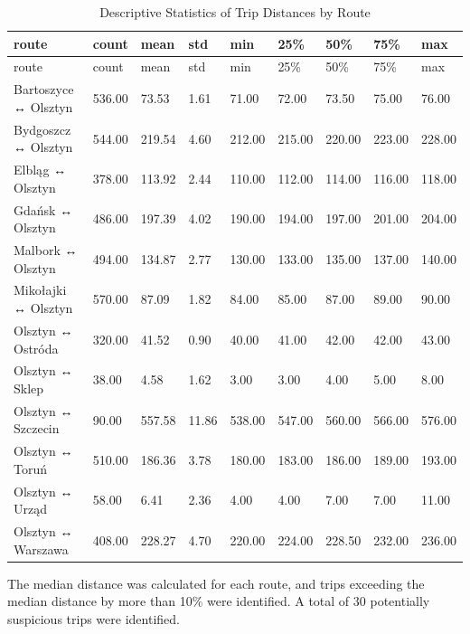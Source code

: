 \documentclass[
  letterpaper,
  DIV=11,
  numbers=noendperiod]{scrartcl}
\begin{document}
\begin{longtable}[]{@{}lllllllll@{}}
\caption{Descriptive Statistics of Trip Distances by
Route}\label{T_25378}\tabularnewline
\toprule\noalign{}
route & count & mean & std & min & 25\% & 50\% & 75\% & max \\
\midrule\noalign{}
\endfirsthead
\toprule\noalign{}
route & count & mean & std & min & 25\% & 50\% & 75\% & max \\
\midrule\noalign{}
\endhead
\bottomrule\noalign{}
\endlastfoot
Bartoszyce ↔ Olsztyn & 536.00 & 73.53 & 1.61 & 71.00 & 72.00 & 73.50 &
75.00 & 76.00 \\
Bydgoszcz ↔ Olsztyn & 544.00 & 219.54 & 4.60 & 212.00 & 215.00 & 220.00
& 223.00 & 228.00 \\
Elbląg ↔ Olsztyn & 378.00 & 113.92 & 2.44 & 110.00 & 112.00 & 114.00 &
116.00 & 118.00 \\
Gdańsk ↔ Olsztyn & 486.00 & 197.39 & 4.02 & 190.00 & 194.00 & 197.00 &
201.00 & 204.00 \\
Malbork ↔ Olsztyn & 494.00 & 134.87 & 2.77 & 130.00 & 133.00 & 135.00 &
137.00 & 140.00 \\
Mikołajki ↔ Olsztyn & 570.00 & 87.09 & 1.82 & 84.00 & 85.00 & 87.00 &
89.00 & 90.00 \\
Olsztyn ↔ Ostróda & 320.00 & 41.52 & 0.90 & 40.00 & 41.00 & 42.00 &
42.00 & 43.00 \\
Olsztyn ↔ Sklep & 38.00 & 4.58 & 1.62 & 3.00 & 3.00 & 4.00 & 5.00 &
8.00 \\
Olsztyn ↔ Szczecin & 90.00 & 557.58 & 11.86 & 538.00 & 547.00 & 560.00 &
566.00 & 576.00 \\
Olsztyn ↔ Toruń & 510.00 & 186.36 & 3.78 & 180.00 & 183.00 & 186.00 &
189.00 & 193.00 \\
Olsztyn ↔ Urząd & 58.00 & 6.41 & 2.36 & 4.00 & 4.00 & 7.00 & 7.00 &
11.00 \\
Olsztyn ↔ Warszawa & 408.00 & 228.27 & 4.70 & 220.00 & 224.00 & 228.50 &
232.00 & 236.00 \\
\end{longtable}

The median distance was calculated for each route, and trips exceeding
the median distance by more than 10\% were identified. A total of 30
potentially suspicious trips were identified.
\end{document}
